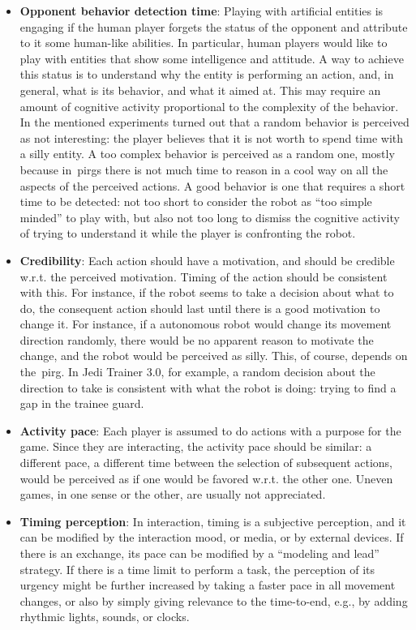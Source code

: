 \begin{itemize}
\item \textbf{Opponent behavior detection time}: Playing with artificial entities is engaging if the human player forgets the status of the opponent and attribute to it some human-like abilities. In particular, human players would like to play with entities that show some intelligence and attitude. A way to achieve this status is to understand why the entity is performing an action, and, in general, what is its behavior, and what it aimed at. This may require an amount of cognitive activity proportional to the complexity of the behavior. In the mentioned experiments turned out that a random behavior is perceived as not interesting: the player believes that it is not worth to spend time with a silly entity. A too complex behavior is perceived as a random one, mostly because in~\gls{pirg}s there is not much time to reason in a cool way on all the aspects of the perceived actions. A good behavior is one that requires a short time to be detected: not too short to consider the robot as ``too simple minded'' to play with, but also not too long to dismiss the cognitive activity of trying to understand it while the player is confronting the robot.

\item \textbf{Credibility}: Each action should have a motivation, and should be credible w.r.t. the perceived motivation. Timing of the action should be consistent with this. For instance, if the robot seems to take a decision about what to do, the consequent action should last until there is a good motivation to change it. For instance, if a autonomous robot would change its movement direction randomly, there would be no apparent reason to motivate the change, and the robot would be perceived as silly. This, of course, depends on the~\gls{pirg}. In Jedi Trainer 3.0, for example, a random decision about the direction to take is consistent with what the robot is doing: trying to find a gap in the trainee guard.

\item \textbf{Activity pace}: Each player is assumed to do actions with a purpose for the game. Since they are interacting, the activity pace should be similar: a different pace, a different time between the selection of subsequent actions, would be perceived as if one would be favored w.r.t. the other one. Uneven games, in one sense or the other, are usually not appreciated.

\item \textbf{Timing perception}: In interaction, timing is a subjective perception, and it can be modified by the interaction mood, or media, or by external devices. If there is an exchange, its pace can be modified by a ``modeling and lead'' strategy. If there is a time limit to perform a task, the perception of its urgency might be further increased by taking a faster pace in all movement changes, or also by simply giving relevance to the time-to-end, e.g., by adding rhythmic lights, sounds, or clocks.
\end{itemize}

